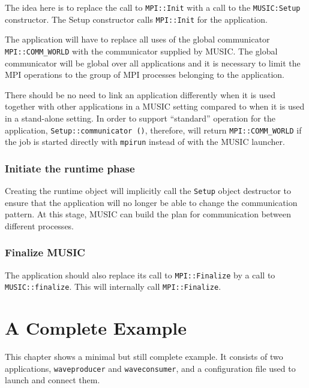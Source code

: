 \documentclass[a4paper,twoside]{report}
\begin{document}
The idea here is to replace the call to \lstinline|MPI::Init| with a
call to the \lstinline|MUSIC:Setup| constructor.  The Setup
constructor calls \lstinline|MPI::Init| for the application.

The application will have to replace all uses of the global
communicator \lstinline|MPI::COMM_WORLD| with the communicator
supplied by MUSIC.  The global communicator will be global over all
applications and it is necessary to limit the MPI operations to the
group of MPI processes belonging to the application.

There should be no need to link an application differently when it is
used together with other applications in a MUSIC setting compared to
when it is used in a stand-alone setting.  In order to support
``standard'' operation for the application,
\lstinline|Setup::communicator ()|, therefore, will return
\lstinline|MPI::COMM_WORLD| if the job is started directly with
\lstinline|mpirun| instead of with the MUSIC launcher.



\subsection{Initiate the runtime phase}

Creating the runtime object will implicitly call the \lstinline|Setup|
object destructor to ensure that the application will no longer be
able to change the communication pattern.  At this stage, MUSIC can
build the plan for communication between different processes.

\subsection{Finalize MUSIC}

The application should also replace its call to
\lstinline|MPI::Finalize| by a call to \lstinline|MUSIC::finalize|.
This will internally call \lstinline|MPI::Finalize|.




\appendix

\chapter{A Complete Example}

This chapter shows a minimal but still complete example.  It consists
of two applications, \texttt{waveproducer} and \texttt{waveconsumer},
and a configuration file used to launch and connect them.
\end{document}
